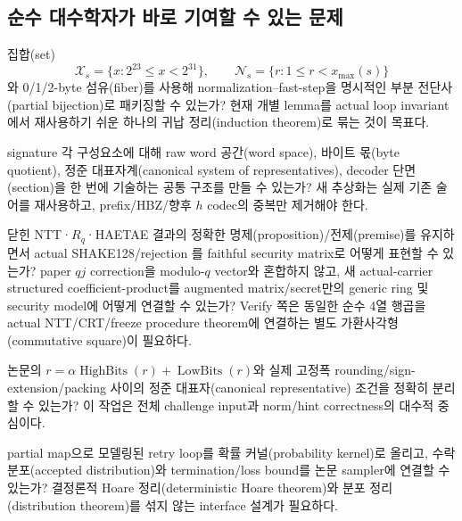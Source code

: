 \subsection{순수 대수학자가 바로 기여할 수 있는 문제}

\begin{question}
집합(set)
\[
  \mathcal X_s=\{x:2^{23}\le x<2^{31}\},\qquad
  \mathcal N_s=\{r:1\le r<x_{\max}(s)\}
\]
와 0/1/2-byte 섬유(fiber)를 사용해 normalization--fast-step을 명시적인
부분 전단사(partial bijection)로 패키징할 수 있는가? 현재 개별 lemma를 actual
loop invariant에서 재사용하기 쉬운 하나의 귀납 정리(induction theorem)로 묶는
것이 목표다.
\end{question}

\begin{question}
signature 각 구성요소에 대해 raw word 공간(word space), 바이트 몫(byte quotient),
정준 대표자계(canonical system of representatives), decoder 단면(section)을 한
번에 기술하는 공통 구조를 만들 수 있는가?
새 추상화는 실제 기존 술어를 재사용하고, prefix/HBZ/향후 \(h\) codec의
중복만 제거해야 한다.
\end{question}

\begin{question}
닫힌 NTT·\(R_q\)·HAETAE 결과의 정확한 명제(proposition)/전제(premise)를
유지하면서 actual SHAKE128/rejection 를 faithful security
matrix로 어떻게 표현할 수 있는가? paper \(qj\) correction을 modulo-\(q\)
vector와 혼합하지 않고, 새 actual-carrier structured coefficient-product를
augmented matrix/secret만의 generic ring  및 security
model에 어떻게 연결할 수 있는가? Verify 쪽은
동일한 순수 4열 행곱을 actual NTT/CRT/freeze procedure theorem에 연결하는 별도
가환사각형(commutative square)이 필요하다.
\end{question}

\begin{question}
논문의 \(r=\alpha\operatorname{HighBits}(r)+\operatorname{LowBits}(r)\)와
실제 고정폭 rounding/sign-extension/packing 사이의
정준 대표자(canonical representative) 조건을 정확히
분리할 수 있는가? 이 작업은 전체 challenge input과 norm/hint correctness의
대수적 중심이다.
\end{question}

\begin{question}
partial map으로 모델링된 retry loop를 확률 커널(probability kernel)로 올리고,
수락 분포(accepted distribution)와 termination/loss bound를 논문 sampler에
연결할 수 있는가?
결정론적 Hoare 정리(deterministic Hoare theorem)와
분포 정리(distribution theorem)를 섞지 않는 interface 설계가 필요하다.
\end{question}

